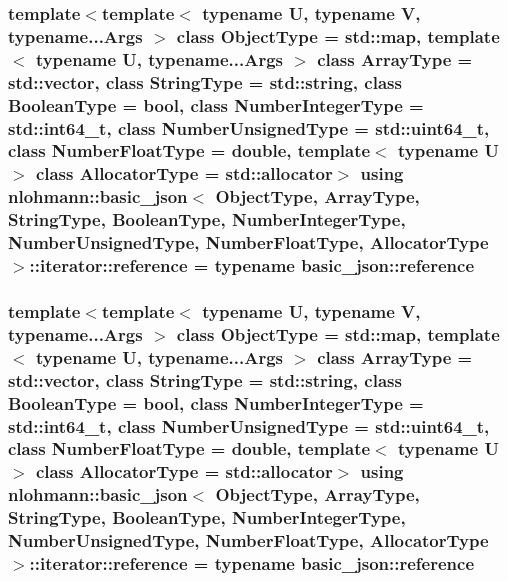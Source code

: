 \hypertarget{classnlohmann_1_1basic__json_1_1iterator_a97aff5d71246774267a81066460dd1cf}{
\subsubsection[{reference}]{\setlength{\rightskip}{0pt plus 5cm}template$<$template$<$ typename U, typename V, typename...\-Args $>$ class Object\-Type = std\-::map, template$<$ typename U, typename...\-Args $>$ class Array\-Type = std\-::vector, class String\-Type  = std\-::string, class Boolean\-Type  = bool, class Number\-Integer\-Type  = std\-::int64\-\_\-t, class Number\-Unsigned\-Type  = std\-::uint64\-\_\-t, class Number\-Float\-Type  = double, template$<$ typename U $>$ class Allocator\-Type = std\-::allocator$>$ using {\bf nlohmann\-::basic\-\_\-json}$<$ Object\-Type, Array\-Type, String\-Type, Boolean\-Type, Number\-Integer\-Type, Number\-Unsigned\-Type, Number\-Float\-Type, Allocator\-Type $>$\-::{\bf iterator\-::reference} =  typename {\bf basic\-\_\-json\-::reference}}}\label{classnlohmann_1_1basic__json_1_1iterator_a97aff5d71246774267a81066460dd1cf}
\hypertarget{classnlohmann_1_1basic__json_1_1iterator_a97aff5d71246774267a81066460dd1cf}{
\subsubsection[{reference}]{\setlength{\rightskip}{0pt plus 5cm}template$<$template$<$ typename U, typename V, typename...\-Args $>$ class Object\-Type = std\-::map, template$<$ typename U, typename...\-Args $>$ class Array\-Type = std\-::vector, class String\-Type  = std\-::string, class Boolean\-Type  = bool, class Number\-Integer\-Type  = std\-::int64\-\_\-t, class Number\-Unsigned\-Type  = std\-::uint64\-\_\-t, class Number\-Float\-Type  = double, template$<$ typename U $>$ class Allocator\-Type = std\-::allocator$>$ using {\bf nlohmann\-::basic\-\_\-json}$<$ Object\-Type, Array\-Type, String\-Type, Boolean\-Type, Number\-Integer\-Type, Number\-Unsigned\-Type, Number\-Float\-Type, Allocator\-Type $>$\-::{\bf iterator\-::reference} =  typename {\bf basic\-\_\-json\-::reference}}}\label{classnlohmann_1_1basic__json_1_1iterator_a97aff5d71246774267a81066460dd1cf}


